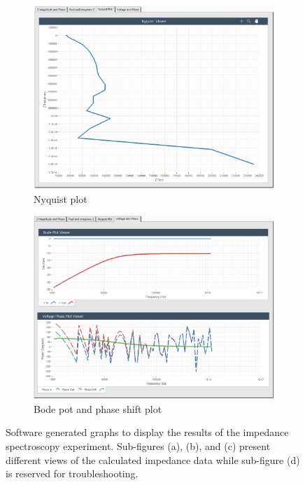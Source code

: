 \begin{figure}[h]
    \vspace{0.2in}
    \vfill
    \begin{subfigure}[b]{0.48\textwidth}
        \centering
        \includegraphics[width=\textwidth]{images/labview_nyquist_graph.png}
        \caption{Nyquist plot}
        \label{fig:labview_nyquist_plot}
    \end{subfigure}
    \hfill
    \begin{subfigure}[b]{0.48\textwidth}
        \centering
        \includegraphics[width=\textwidth]{images/labview_bode_phase_graph.png}
        \caption{Bode pot and phase shift plot}
        \label{fig:labview_bode-phase_plot}
    \end{subfigure}
    \caption[The software generated impedance spectroscopy graphs.]{Software generated graphs to display the results of the impedance spectroscopy experiment. Sub-figures (a), (b), and (c) present different views of the calculated impedance data while sub-figure (d) is reserved for troubleshooting.}
    \label{fig:labview_IS_graphs}
\end{figure}

